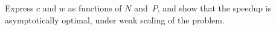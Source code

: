   Express $c$ and $w$ as functions of $N$ and~$P$, and show that the
  speedup is asymptotically optimal, under weak scaling of the problem.

